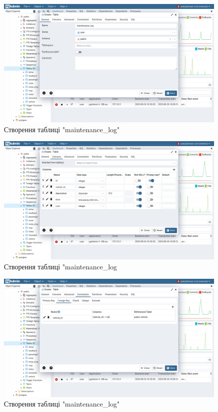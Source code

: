 \documentclass[14pt]{extreport}
\begin{document}
\begin{normalsize}
	\begin{figure}[H]
		\centering
		\includegraphics[scale=0.35]{44}
		\caption{Створення таблиці "maintenance\_log"}
	\end{figure}
	
	\begin{figure}[H]
		\centering
		\includegraphics[scale=0.35]{45}
		\caption{Створення таблиці "maintenance\_log}
	\end{figure}
	
	\begin{figure}[H]
		\centering
		\includegraphics[scale=0.35]{46}
		\caption{Створення таблиці "maintenance\_log"}
	\end{figure}
	\fi

\end{normalsize}
\end{document}
